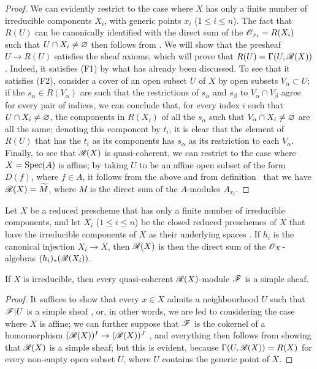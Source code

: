 \begin{proof}
\label{proof-1.7.3.3}
We can evidently restrict to the case where $X$ has only a finite number of irreducible components $X_i$, with generic points $x_i$ ($1\leqslant i\leqslant n$).
The fact that $R(U)$ can be canonically identified with the direct sum of the $\mathscr{O}_{x_i}=R(X_i)$ such that $U\cap X_i\neq\varnothing$ then follows from .
We will show that the presheaf $U\to R(U)$ satisfies the sheaf axioms, which will prove that $R(U)=\Gamma(U,\mathscr{R}(X))$.
Indeed, it satisfies (F1) by what has already been discussed.
To see that it satisfies (F2), consider a cover of an open subset $U$ of $X$ by open subsets $V_\alpha\subset U$; if the $s_\alpha\in R(V_\alpha)$ are such that the restrictions of $s_\alpha$ and $s_\beta$ to $V_\alpha\cap V_\beta$ agree for every pair of indices, we can conclude that, for every index $i$ such that $U\cap X_i\neq\varnothing$, the components in $R(X_i)$ of all the $s_\alpha$ such that $V_\alpha\cap X_i\neq\varnothing$ are all the same; denoting this component by $t_i$, it is clear that the element of $R(U)$ that has the $t_i$ as its components has $s_\alpha$ as its restriction to each $V_\alpha$.
Finally, to see that $\mathscr{R}(X)$ is quasi-coherent, we can restrict to the case where $X={\mathop{\mathrm{Spec}}\nolimits}(A)$ is affine; by taking $U$ to be an affine open subset of the form $D(f)$, where $f\in A$, it follows from the above and from definition~ that we have $\mathscr{R}(X)=\widetilde{M}$, where $M$ is the direct sum of the $A$-modules $A_{x_i}$.
\end{proof}

\begin{cor}[7.3.4]
\label{1.7.3.4}
Let $X$ be a reduced prescheme that has only a finite number of irreducible components, and let $X_i$ ($1\leqslant i\leqslant n$) be the closed reduced preschemes of $X$ that have the irreducible components of $X$ as their underlying spaces .
If $h_i$ is the canonical injection $X_i\to X$, then $\mathscr{R}(X)$ is then the direct sum of the $\mathscr{O}_X$-algebras $(h_i)_*(\mathscr{R}(X_i))$.
\end{cor}

\begin{cor}[7.3.5]
\label{1.7.3.5}
If $X$ is irreducible, then every quasi-coherent $\mathscr{R}(X)$-module $\mathscr{F}$ is a simple sheaf.
\end{cor}

\begin{proof}
\label{proof-1.7.3.5}
It suffices to show that every $x\in X$ admits a neighbourhood $U$ such that $\mathscr{F}|U$ is a simple sheaf , or, in other words, we are led to considering the case where $X$ is affine; we can further suppose that $\mathscr{F}$ is the cokernel of a homomorphism $(\mathscr{R}(X))^{I}\to(\mathscr{R}(X))^{J}$ , and everything then follows from showing that $\mathscr{R}(X)$ is a simple sheaf; but this is evident, because $\Gamma(U,\mathscr{R}(X))=R(X)$ for every non-empty open subset $U$, where $U$ contains the generic point of $X$.
\end{proof}

